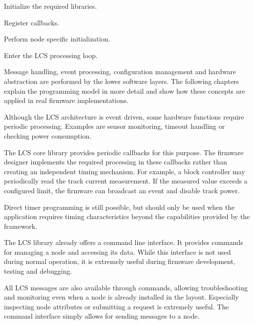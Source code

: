 \begin{smallGapEnumerate}
    \item Initialize the required libraries.
    \item Register callbacks.
    \item Perform node specific initialization.
    \item Enter the LCS processing loop.
\end{smallGapEnumerate}

Message handling, event processing, configuration management and hardware
abstraction are performed by the lower software layers.
The following chapters explain the programming model in more detail and show how
these concepts are applied in real firmware implementations.


Although the LCS architecture is event driven, some hardware functions require
periodic processing. Examples are sensor monitoring, timeout handling or
checking power consumption.

The LCS core library provides periodic callbacks for this purpose. The firmware
designer implements the required processing in these callbacks rather than
creating an independent timing mechanism.
For example, a block controller may periodically read the track current
measurement. If the measured value exceeds a configured limit, the firmware can
broadcast an event and disable track power.

Direct timer programming is still possible, but should only be used when the
application requires timing characteristics beyond the capabilities provided by
the framework.


The LCS library already offers a command line interface. It provides commands
for managing a node and accessing its data. While this interface is not used
during normal operation, it is extremely useful during firmware development,
testing and debugging.

All LCS messages are also available through commands, allowing troubleshooting
and monitoring even when a node is already installed in the layout. Especially 
inspecting node attributes or submitting a request is extremely useful. The 
command interface simply allows for sending messages to a node.

